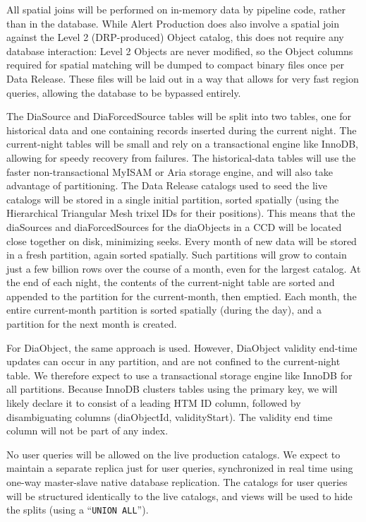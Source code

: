 \documentclass[DM,toc]{lsstdoc}
\begin{document}
All spatial joins will be performed on in-memory data by pipeline code,
rather than in the database. While Alert Production does also involve a
spatial join against the Level 2 (DRP-produced) Object catalog, this
does not require any database interaction: Level 2 Objects are never
modified, so the Object columns required for spatial matching will be
dumped to compact binary files once per Data Release. These files will
be laid out in a way that allows for very fast region queries, allowing
the database to be bypassed entirely.

The DiaSource and DiaForcedSource tables will be split into two tables,
one for historical data and one containing records inserted during the
current night. The current-night tables will be small and rely on a
transactional engine like InnoDB, allowing for speedy recovery from
failures. The historical-data tables will use the faster
non-transactional MyISAM or Aria storage engine, and will also take
advantage of partitioning. The Data Release catalogs used to seed the
live catalogs will be stored in a single initial partition, sorted
spatially (using the Hierarchical Triangular Mesh trixel IDs for their
positions). This means that the diaSources and diaForcedSources for the
diaObjects in a CCD will be located close together on disk, minimizing
seeks. Every month of new data will be stored in a fresh partition,
again sorted spatially. Such partitions will grow to contain just a few
billion rows over the course of a month, even for the largest catalog.
At the end of each night, the contents of the current-night table are
sorted and appended to the partition for the current-month, then
emptied. Each month, the entire current-month partition is sorted
spatially (during the day), and a partition for the next month is
created.

For DiaObject, the same approach is used. However, DiaObject validity
end-time updates can occur in any partition, and are not confined to the
current-night table. We therefore expect to use a transactional storage
engine like InnoDB for all partitions. Because InnoDB clusters tables
using the primary key, we will likely declare it to consist of a leading
HTM ID column, followed by disambiguating columns (diaObjectId,
validityStart). The validity end time column will not be part of any
index.

No user queries will be allowed on the live production catalogs. We
expect to maintain a separate replica just for user queries,
synchronized in real time using one-way master-slave native database
replication. The catalogs for user queries will be structured
identically to the live catalogs, and views will be used to hide the
splits (using a ``\texttt{UNION\ ALL}'').
\end{document}
